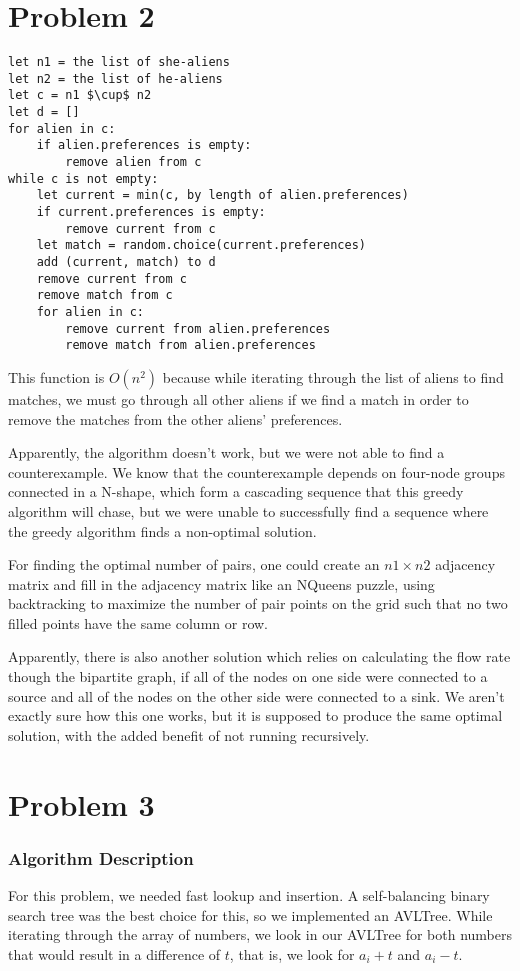 \documentclass[letterpaper, 12pt]{math}
\begin{document}
\section*{Problem 2}
\begin{lstlisting}[mathescape=true]
let n1 = the list of she-aliens
let n2 = the list of he-aliens
let c = n1 $\cup$ n2
let d = []
for alien in c:
    if alien.preferences is empty:
        remove alien from c
while c is not empty:
    let current = min(c, by length of alien.preferences)
    if current.preferences is empty:
        remove current from c
    let match = random.choice(current.preferences)
    add (current, match) to d
    remove current from c
    remove match from c
    for alien in c:
        remove current from alien.preferences
        remove match from alien.preferences
\end{lstlisting}
This function is \( O(n^2) \) because while iterating through the list of
aliens to find matches, we must go through all other aliens if we find a match
in order to remove the matches from the other aliens' preferences.
\par
Apparently, the algorithm doesn't work, but we were not able to find a
counterexample. We know that the counterexample depends on four-node groups
connected in a N-shape, which form a cascading sequence that this greedy
algorithm will chase, but we were unable to successfully find a sequence
where the greedy algorithm finds a non-optimal solution.
\par
For finding the optimal number of pairs, one could create an \( n1\times n2 \)
adjacency matrix and fill in the adjacency matrix like an NQueens puzzle, using
backtracking to maximize the number of pair points on the grid such that no
two filled points have the same column or row.
\par
Apparently, there is also another solution which relies on calculating the flow
rate though the bipartite graph, if all of the nodes on one side were connected
to a source and all of the nodes on the other side were connected to a sink. We
aren't exactly sure how this one works, but it is supposed to produce the same
optimal solution, with the added benefit of not running recursively.

\section*{Problem 3}

\subsubsection*{Algorithm Description}
For this problem, we needed fast lookup and insertion. A self-balancing binary
search tree was the best choice for this, so we implemented an AVLTree.
While iterating through the array of numbers, we look in our AVLTree for both
numbers that would result in a difference of \( t \), that is, we look for
\( a_i+t \) and \( a_i-t \).
\end{document}
